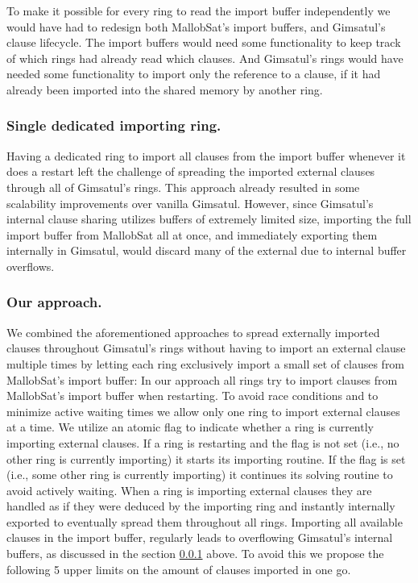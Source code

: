 \documentclass[12pt,a4paper,twoside]{scrartcl}
\numberwithin{equation}{section}
\begin{document}
To make it possible for every ring to read the import buffer independently we would have had to redesign both MallobSat's import buffers, and Gimsatul's clause lifecycle. The import buffers would need some functionality to keep track of which rings had already read which clauses. And Gimsatul's rings would have needed some functionality to import only the reference to a clause, if it had already been imported into the shared memory by another ring. 

\subsubsection{Single dedicated importing ring.}
\label{sec:singleDedicatedImportRing}

Having a dedicated ring to import all clauses from the import buffer whenever it does a restart left the challenge of spreading the imported external clauses through all of Gimsatul's rings. This approach already resulted in some scalability improvements over vanilla Gimsatul. However, since Gimsatul's internal clause sharing utilizes buffers of extremely limited size, importing the full import buffer from MallobSat all at once, and immediately exporting them internally in Gimsatul, would discard many of the external due to internal buffer overflows.

\subsubsection{Our approach.}
\label{sec:ourApproach}

We combined the aforementioned approaches to spread externally imported clauses throughout Gimsatul's rings without having to import an external clause multiple times by letting each ring exclusively import a small set of clauses from MallobSat's import buffer: 
In our approach all rings try to import clauses from MallobSat's import buffer when restarting. To avoid race conditions and to minimize active waiting times we allow only one ring to import external clauses at a time. We utilize an atomic flag to indicate whether a ring is currently importing external clauses. If a ring is restarting and the flag is not set (i.e., no other ring is currently importing) it starts its importing routine. If the flag is set (i.e., some other ring is currently importing) it continues its solving routine to avoid actively waiting. 
When a ring is importing external clauses they are handled as if they were deduced by the importing ring and instantly internally exported to eventually spread them throughout all rings. Importing all available clauses in the import buffer, regularly leads to overflowing Gimsatul's internal buffers, as discussed in the section \ref{sec:singleDedicatedImportRing} above. To avoid this we propose the following 5 upper limits on the amount of clauses imported in one go.
\end{document}
